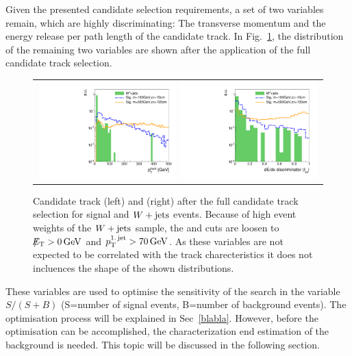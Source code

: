 Given the presented candidate selection requirements, a set of two variables remain, which are highly discriminating:
The transverse momentum and the energy release per path length of the candidate track.
In Fig.~\ref{fig:PtAndIasAfterFullPreselection}, the distribution of the remaining two variables are shown after the application of the full candidate track selection.
\begin{figure}[!tb]
  \centering 
  \begin{tabular}{c}
    \includegraphics[width=0.49\textwidth]{figures/analysis/htrackPt_log_fullSelectionNoTrigger.pdf}
    \includegraphics[width=0.49\textwidth]{figures/analysis/htrackASmiSmallRange_log_fullSelectionNoTrigger.pdf}
  \end{tabular}
  \caption{Candidate track \pt (left) and \ias (right) after the full candidate track selection for signal and $W+\text{jets}$ events. 
           Because of high event weights of the $W+\text{jets}$ sample, the \met and \ptfirstjet cuts are loosen to $\slash\mkern-12mu{E}_{\text{T}}>0\,\text{Ge}\kern-0.06667em\text{V}$ and $p_{\text{T}}^{\text{1.\,jet}}>70\,\text{Ge}\kern-0.06667em\text{V}$. 
           As these variables are not expected to be correlated with the track charecteristics it does not incluences the shape of the shown distributions.}
  \label{fig:PtAndIasAfterFullPreselection}
\end{figure}
\hspace{0.9cm}
These variables are used to optimise the sensitivity of the search in the variable $S/(S+B)$ (S=number of signal events, B=number of background events).
The optimisation process will be explained in Sec~\ref{blabla}.
However, before the optimisation can be accomplished, the characterization end estimation of the background is needed.
This topic will be discussed in the following section.



